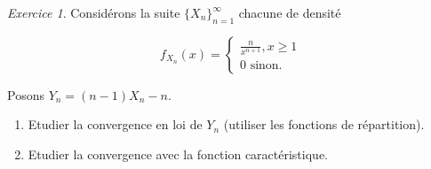 \documentclass[french]{book}
\theoremstyle{definition}
\theoremstyle{remark}
\newtheorem{exo}{Exercice}
\begin{document}
\begin{exo}
  Considérons la suite \(\{ X_n \}_{n=1}^{\infty}\) chacune de densité

  \[f _{X_n}(x) = \begin{cases}
    \frac{n}{x ^{n+1}}, x \geq  1 \\
    0 \text{ sinon. }
  \end{cases}\]

  Posons \(Y_n = (n-1)X_n -n\).

  \begin{enumerate}
    \item Etudier la convergence en loi de \(Y_n\) (utiliser les fonctions de répartition).
    \item Etudier la convergence avec la fonction caractéristique.
  \end{enumerate}
\end{exo}
\end{document}
